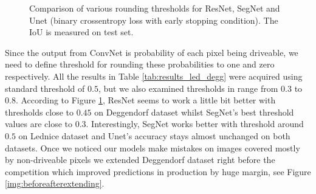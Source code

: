 \begin{figure}[h!]
	\begin{center}
	    \hspace{0.01em}
	\end{center}
	\caption[Various rounding thresholds for ResNet, SegNet and Unet]{Comparison of various
	rounding thresholds for ResNet, SegNet and Unet (binary crossentropy loss with early
	stopping condition). The IoU is measured on test set.}
	\label{img:thresholds_base_models}
\end{figure}

Since the output from ConvNet is probability of each pixel being driveable, we need to define
threshold for rounding these probabilities to one and zero respectively. All the results
in Table \ref{tab:results_led_degg} were acquired using standard threshold of $0.5$, but
we also examined thresholds in range from $0.3$ to $0.8$.
According to Figure \ref{img:thresholds_base_models}, ResNet seems to work a little bit better
with thresholds close to $0.45$ on Deggendorf dataset whilst SegNet's best threshold values
are close to $0.3$. Interestingly, SegNet works better with threshold around $0.5$ on
Lednice dataset and Unet's accuracy stays almost unchanged on both datasets.
Once we noticed our models make mistakes on images covered mostly by non-driveable pixels
we extended Deggendorf dataset right before the competition which improved predictions
in production by huge margin, see Figure \ref{img:beforeafterextending}.

